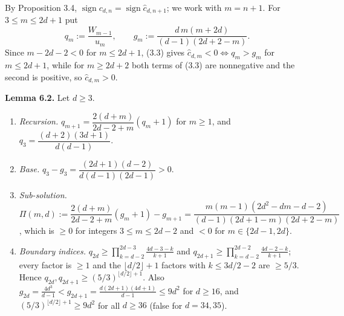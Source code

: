 \documentclass[
  11pt,
  a4paper,
]{article}
\begin{document}
By Proposition 3.4,
\(\operatorname{sign}c_{d,\allowbreak{}n}=\operatorname{sign}\hat c_{d,\allowbreak{}n+1}\); we
work with \(m=n+1\). For \(3\le m\le2d+1\) put
\[q_m:=\frac{W_{m-1}}{u_m},\qquad g_m:=\frac{d\,m(m+2d)}{(d-1)(2d+2-m)}.\]
Since \(m-2d-2<0\) for \(m\le2d+1\), (3.3) gives
\(\hat c_{d,\allowbreak{}m}<0\iff q_m>g_m\) for \(m\le2d+1\), while for \(m\ge2d+2\)
both terms of (3.3) are nonnegative and the second is positive, so
\(\hat c_{d,\allowbreak{}m}>0\).

\textbf{Lemma 6.2.} Let \(d\ge3\).

\begin{enumerate}
\def\labelenumi{(\roman{enumi})}
\item
  \emph{Recursion.} \(q_{m+1}=\dfrac{2(d+m)}{2d-2+m}(q_m+1)\) for
  \(m\ge1\), and \(q_3=\dfrac{(d+2)(3d+1)}{d(d-1)}\).
\item
  \emph{Base.} \(q_3-g_3=\dfrac{(2d+1)(d-2)}{d(d-1)(2d-1)}>0\).
\item
  \emph{Sub-solution.}
  \(\Pi(m,\allowbreak{}d):=\dfrac{2(d+m)}{2d-2+m}(g_m+1)-g_{m+1}=\dfrac{m(m-1)(2d^2-dm-d-2)}{(d-1)(2d+1-m)(2d+2-m)}\),
  which is \(\ge0\) for integers \(3\le m\le2d-2\) and \(<0\) for
  \(m\in\{2d-1,\allowbreak{}2d\}\).
\item
  \emph{Boundary indices.}
  \(q_{2d}\ge\prod_{k=d-2}^{2d-3}\frac{4d-3-k}{k+1}\) and
  \(q_{2d+1}\ge\prod_{k=d-2}^{2d-2}\frac{4d-2-k}{k+1}\); every factor is
  \(\ge1\) and the \(\lfloor d/2\rfloor+1\) factors with \(k\le3d/2-2\)
  are \(\ge5/3\). Hence
  \(q_{2d},\allowbreak{}q_{2d+1}\ge(5/3)^{\lfloor d/2\rfloor+1}\). Also
  \(g_{2d}=\frac{4d^3}{d-1}<g_{2d+1}=\frac{d(2d+1)(4d+1)}{d-1}\le9d^2\)
  for \(d\ge16\), and \((5/3)^{\lfloor d/2\rfloor+1}\ge9d^2\) for all
  \(d\ge36\) (false for \(d=34,\allowbreak{}35\)).
\end{enumerate}
\end{document}
